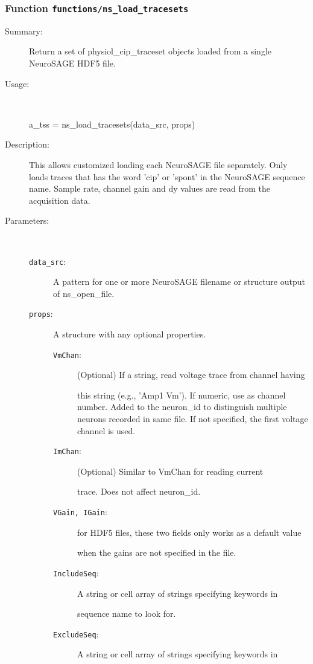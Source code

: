 \subsubsection[Function \texttt{ns\_load\_tracesets}]{Function \texttt{functions/ns\_load\_tracesets}}%
%
\label{ref_functions__ns_load_tracesets}%
\hypertarget{ref_functions__ns_load_tracesets}{}%
\begin{description}
\item[Summary:]Return a set of physiol\_cip\_traceset objects loaded from a single NeuroSAGE HDF5 file.
%
\item[Usage:]~%
\begin{lyxcode}%
a\_tss = ns\_load\_tracesets(data\_src, props)
%
\end{lyxcode}%
%
\item[Description:]%
This allows customized loading each NeuroSAGE file separately. Only
 loads traces that has the word 'cip' or 'spont' in the NeuroSAGE sequence name.
 Sample rate, channel gain and dy values are read from the acquisition data.
\item[Parameters:]~
\begin{description}%
\item[\texttt{data\_src}:]
 A pattern for one or more NeuroSAGE filename or structure output of ns\_open\_file.
\item[\texttt{props}:]
 A structure with any optional properties.
\begin{description}%
\item[\texttt{VmChan}:]
 (Optional) If a string, read voltage trace from channel having

this string (e.g., 'Amp1 Vm'). If numeric, use as channel
number. Added to the neuron\_id to distinguish
multiple neurons recorded in same file. If not
specified, the first voltage channel is used.
\item[\texttt{ImChan}:]
 (Optional) Similar to VmChan for reading current

trace. Does not affect neuron\_id.
\item[\texttt{VGain, IGain}:]
 for HDF5 files, these two fields only works as a default value

when the gains are not specified in the file.
\item[\texttt{IncludeSeq}:]
 A string or cell array of strings specifying keywords in

sequence name to look for.
\item[\texttt{ExcludeSeq}:]
 A string or cell array of strings specifying keywords in


\end{description}
\end{description}
\end{description}
